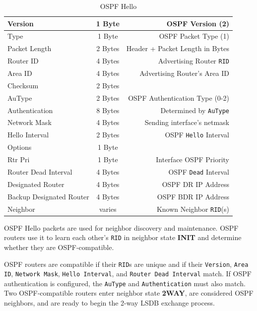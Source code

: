 \documentclass[12pt]{article}
\begin{document}
	\begin{table}[H]
	\centering
	\caption{OSPF Hello \label{tab:OSPF HELLO}}
	\begin{tabular}{| l | c | r |}
	\hline
	Version				& 1 Byte	& OSPF Version (2)\\\hline
	Type					& 1 Byte	& OSPF Packet Type (1)\\\hline
	Packet Length			& 2 Bytes	& Header + Packet Length in Bytes\\\hline
	Router ID				& 4 Bytes	& Advertising Router \texttt{RID}\\\hline
	Area ID				& 4 Bytes	& Advertising Router's Area ID\\\hline
	Checksum				& 2 Bytes	&\\\hline
	AuType				& 2 Bytes	& OSPF Authentication Type (0-2)\\\hline
	Authentication			& 8 Bytes	& Determined by \texttt{AuType}\\\hline
	Network Mask			& 4 Bytes	& Sending interface's netmask\\\hline
	Hello Interval			& 2 Bytes	& OSPF \texttt{Hello} Interval\\\hline
	Options				& 1 Byte	&\\\hline
	Rtr Pri				& 1 Byte	& Interface OSPF Priority\\\hline
	Router Dead Interval		& 4 Bytes	& OSPF \texttt{Dead} Interval\\\hline
	Designated Router		& 4 Bytes	& OSPF DR IP Address\\\hline
	Backup Designated Router	& 4 Bytes	& OSPF BDR IP Address\\\hline
	Neighbor				& varies	& Known Neighbor \texttt{RID}(s)\\\hline
	\end{tabular}\end{table}
	OSPF Hello packets are used for neighbor discovery and maintenance. OSPF routers use it to learn each other's \texttt{RID} in neighbor state \textbf{INIT} and determine whether they are OSPF-compatible.
	
	OSPF routers are compatible if their \texttt{RID}s are unique and if their \texttt{Version}, \texttt{Area ID}, \texttt{Network Mask}, \texttt{Hello Interval}, and \texttt{Router Dead Interval} match. If OSPF authentication is configured, the \texttt{AuType} and \texttt{Authentication} must also match. Two OSPF-compatible routers enter neighbor state \textbf{2WAY}, are considered OSPF neighbors, and are ready to begin the 2-way LSDB exchange process.
	
\end{document}
